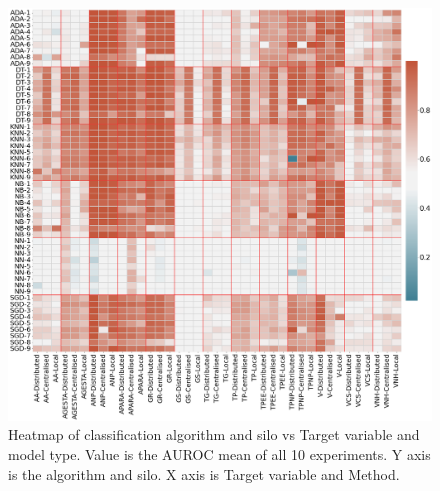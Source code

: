 



\begin{figure}[htbp]
\centering
\captionsetup{justification=centering}

\caption{Heatmap of classification algorithm and silo vs Target variable and model type. Value is the AUROC mean of all 10 experiments. Y axis is the algorithm and silo. X axis is Target variable and Method.}\label{fig:heatmap-cat} 
\includegraphics[scale=0.22]{figures/heatmap-class.png}
\end{figure}

